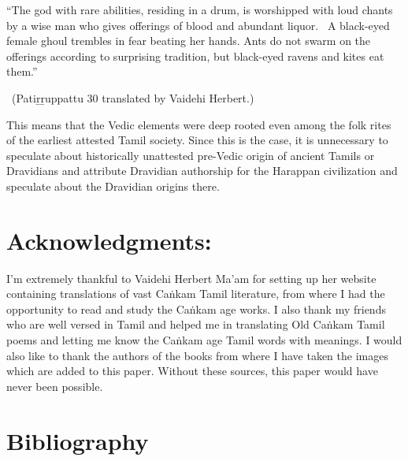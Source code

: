 \begin{myquote}
“The god with rare abilities, residing in a drum, is worshipped with loud chants by a wise man who gives offerings of blood and abundant liquor.  A black-eyed female ghoul trembles in fear beating her hands. Ants do not swarm on the offerings according to surprising tradition, but black-eyed ravens and kites eat them.”

~\hfill (Patiṟṟuppattu 30 translated by Vaidehi Herbert.)
\end{myquote}

This means that the Vedic elements were deep rooted even among the folk rites of the earliest attested Tamil society. Since this is the case, it is unnecessary to speculate about historically unattested pre-Vedic origin of ancient Tamils or Dravidians and attribute Dravidian authorship for the Harappan civilization and speculate about the Dravidian origins there.


\section*{Acknowledgments:}

I’m extremely thankful to Vaidehi Herbert Ma’am for setting up her website containing translations of vast Caṅkam Tamil literature, from where I had the opportunity to read and study the Caṅkam age works. I also thank my friends who are well versed in Tamil and helped me in translating Old Caṅkam Tamil poems and letting me know the Caṅkam age Tamil words with meanings. I would also like to thank the authors of the books from where I have taken the images which are added to this paper. Without these sources, this paper would have never been possible.

\newpage


\section*{Bibliography}

